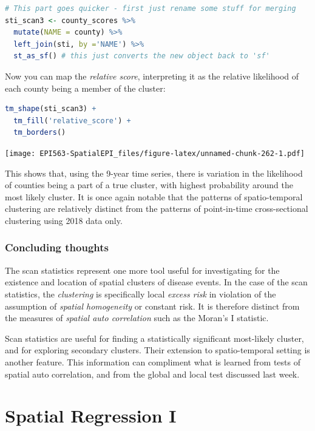 \documentclass[
]{book}
\begin{document}
\begin{lstlisting}[language=R]
# This part goes quicker - first just rename some stuff for merging
sti_scan3 <- county_scores %>% 
  mutate(NAME = county) %>%
  left_join(sti, by ='NAME') %>%
  st_as_sf() # this just converts the new object back to 'sf'
\end{lstlisting}

Now you can map the \emph{relative score}, interpreting it as the relative likelihood of each county being a member of the cluster:

\begin{lstlisting}[language=R]
tm_shape(sti_scan3) +
  tm_fill('relative_score') + 
  tm_borders()
\end{lstlisting}

\texttt{[image: EPI563-SpatialEPI\_files/figure-latex/unnamed-chunk-262-1.pdf]}

This shows that, using the 9-year time series, there is variation in the likelihood of counties being a part of a true cluster, with highest probability around the most likely cluster. It is once again notable that the patterns of spatio-temporal clustering are relatively distinct from the patterns of point-in-time cross-sectional clustering using 2018 data only.

\hypertarget{concluding-thoughts}{%
\subsection{Concluding thoughts}\label{concluding-thoughts}}

The scan statistics represent one more tool useful for investigating for the existence and location of spatial clusters of disease events. In the case of the scan statistics, the \emph{clustering} is specifically local \emph{excess risk} in violation of the assumption of \emph{spatial homogeneity} or constant risk. It is therefore distinct from the measures of \emph{spatial auto correlation} such as the Moran's I statistic.

Scan statistics are useful for finding a statistically significant most-likely cluster, and for exploring secondary clusters. Their extension to spatio-temporal setting is another feature. This information can compliment what is learned from tests of spatial auto correlation, and from the global and local test discussed last week.

\hypertarget{spatreg1}{%
\chapter{Spatial Regression I}\label{spatreg1}}
\end{document}
